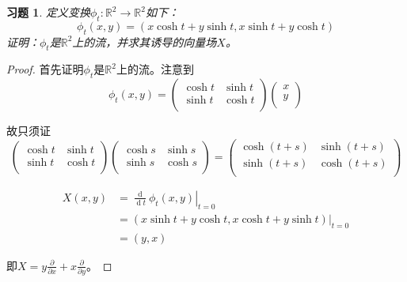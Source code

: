 \documentclass[winfonts,UTF8,c5size,a4paper,fancyhdr,hyperref,titlepage,nocap]{ctexart}
\newtheorem{xiti}{习题}
\theoremstyle{definition}
\theoremstyle{remark}
\numberwithin{equation}{subsection}
\newcommand{\Real}{\mathbb{R}}
\newcommand{\dt}{\frac{\operatorname{d}}{\operatorname{d}t}}
\newcommand{\pfrac}[2]{\frac{\partial{#1}}{\partial{#2}}}
\newcommand{\local}[2]{\left.{#1}\right|_{#2}}%
\newcommand{\localt}[1]{\local{#1}{t=0}}%
\begin{document}
\begin{xiti}
  定义变换$\phi_t\colon\Real^2\to\Real^2$如下：
  \begin{equation*}
    \phi_t(x,y)=(x\cosh t+y\sinh t,x\sinh t+y\cosh t)
  \end{equation*}
  证明：$\phi_t$是$\Real^2$上的流，并求其诱导的向量场$X$。
\end{xiti}
\begin{proof}
  首先证明$\phi_t$是$\Real^2$上的流。注意到
  \begin{equation*}
    \phi_t(x,y)=\begin{pmatrix}
                  \cosh t & \sinh t \\
                  \sinh t & \cosh t \\
                \end{pmatrix}\begin{pmatrix}
                               x \\
                               y \\
                             \end{pmatrix}
  \end{equation*}

  故只须证
  \begin{equation*}
      \begin{pmatrix}
                  \cosh t & \sinh t \\
                  \sinh t & \cosh t \\
      \end{pmatrix}
      \begin{pmatrix}
                  \cosh s & \sinh s \\
                  \sinh s & \cosh s \\
      \end{pmatrix}
      =
      \begin{pmatrix}
                  \cosh (t+s) & \sinh (t+s) \\
                  \sinh (t+s) & \cosh (t+s) \\
      \end{pmatrix}
  \end{equation*}

  \begin{align*}
    X(x,y) &=\localt{\dt\phi_t(x,y)} \\
     &=\localt{(x\sinh t+y\cosh t, x\cosh t+y\sinh t)}\\
     &=(y,x)
  \end{align*}

  即$X=y\pfrac{}{x}+x\pfrac{}{y}$。
\end{proof}
\end{document}
